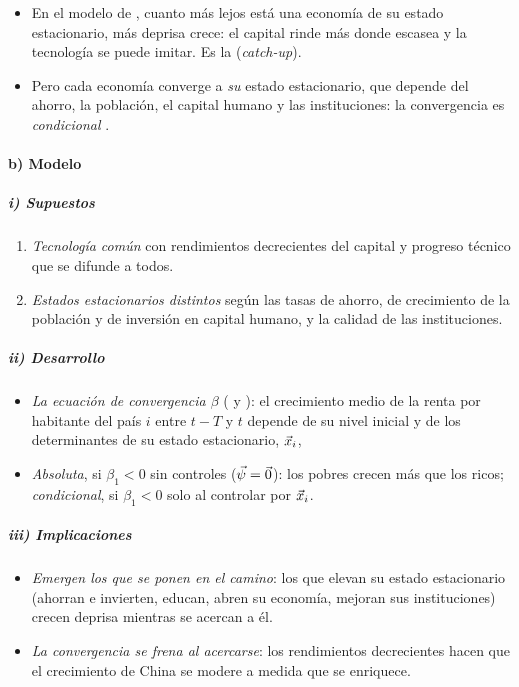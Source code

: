 \documentclass[11pt]{article}
\begin{document}
\begin{itemize}
\item En el modelo de , cuanto más lejos está una economía de su estado estacionario, más deprisa crece: el capital rinde más donde escasea y la tecnología se puede imitar. Es la  (\emph{catch-up}).
\item Pero cada economía converge a \emph{su} estado estacionario, que depende del ahorro, la población, el capital humano y las instituciones: la convergencia es \emph{condicional}  .
\end{itemize}

\paragraph{b) Modelo}

\subparagraph{i) Supuestos}

\begin{enumerate}
\item \emph{Tecnología común} con rendimientos decrecientes del capital y progreso técnico que se difunde a todos.
\item \emph{Estados estacionarios distintos} según las tasas de ahorro, de crecimiento de la población y de inversión en capital humano, y la calidad de las instituciones.
\end{enumerate}

\subparagraph{ii) Desarrollo}

\begin{itemize}
\item \emph{La ecuación de convergencia $\beta$} ( y ): el crecimiento medio de la renta por habitante del país $i$ entre $t-T$ y $t$ depende de su nivel inicial y de los determinantes de su estado estacionario, $\vec{x}_i$,
\item \emph{Absoluta}, si $\beta_1<0$ sin controles ($\vec{\psi}=\vec{0}$): los pobres crecen más que los ricos; \emph{condicional}, si $\beta_1<0$ solo al controlar por $\vec{x}_i$\nocite{BarroSalaiMartin1992,MankiwRomerWeil1992}.
\end{itemize}

\subparagraph{iii) Implicaciones}

\begin{itemize}
\item \emph{Emergen los que se ponen en el camino}: los que elevan su estado estacionario (ahorran e invierten, educan, abren su economía, mejoran sus instituciones) crecen deprisa mientras se acercan a él.
\item \emph{La convergencia se frena al acercarse}: los rendimientos decrecientes hacen que el crecimiento de China se modere a medida que se enriquece.
\end{itemize}
\end{document}
